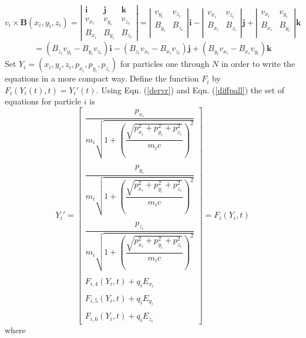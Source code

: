 \documentclass[oneside,12pt]{book}
\renewcommand{\vec}{\mathbf}
\begin{document}
$$v_i \times \vec{B}(x_i,y_i,z_i) =
\left|
\begin{array}{ccc}
\vec{i} & \vec{j} & \vec{k} \\
v_{x_i} & v_{y_i} & v_{z_i} \\
B_{x_i}  & B_{y_i} & B_{z_i}
\end{array}
\right|=
\left|
\begin{array}{cc}
v_{y_i} & v_{z_i} \\
B_{y_i} & B_{z_i} \\
\end{array}
\right| 
\vec{i} -
\left|
\begin{array}{cc}
v_{x_i} & v_{z_i} \\
B_{x_i} & B_{z_i} \\
\end{array}
\right| 
\vec{j} +
\left|
\begin{array}{cc}
v_{x_i} & v_{y_i} \\
B_{x_i} & B_{y_i} \\
\end{array}
\right| 
\vec{k}$$
$$=(B_{z_i} v_{y_i} - B_{y_i} v_{z_i}) \vec{i} -
(B_{z_i} v_{x_i} - B_{x_i} v_{z_i}) \vec{j} +
(B_{y_i} v_{x_i} - B_{x_i} v_{y_i}) \vec{k}$$
Set $Y_i=(x_i,y_i,z_i,p_{x_i},p_{y_i},p_{z_i})$ for particles one through $N$ in order to write the equations in a more compact way. Define the function $F_i$ by $F_i(Y_i(t),t)=Y_i'(t)$.  Using Eqn. (\ref{dervr}) and Eqn. (\ref{diffpall}) the set of equations for particle $i$ is
\begin{equation}
Y_i'=\left[
\begin{array}{c}
\dfrac{p_{x_i}}{m_i \sqrt{1+\left(\dfrac{\sqrt{p_{x_i}^2 + p_{y_i}^2 + p_{z_i}^2}}{m_i c}\right)^2}}
\\
\\
\dfrac{p_{y_i}}{m_i \sqrt{1+\left(
 \dfrac{\sqrt{p_{x_i}^2 + p_{y_i}^2 + p_{z_i}^2}}{m_i c}\right)^2}}
\\
\\
\dfrac{p_{z_i}}{m_i \sqrt{1+\left(
 \dfrac{\sqrt{p_{x_i}^2 + p_{y_i}^2 + p_{z_i}^2}}{m_i c}\right)^2}} 
\\
\\
F_{i,4} (Y_i,t)+q_i E_{x_i}
\\
\\
F_{i,5} (Y_i,t)+q_i E_{y_i}
\\
\\
F_{i,6} (Y_i,t)+q_i E_{z_i}
\end{array}
\right]=F_i(Y_i,t)
\label{diffYiall}
\end{equation}
where
\end{document}
